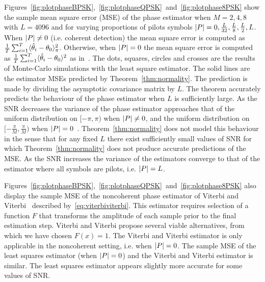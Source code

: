 \documentclass[journal]{IEEEtran}
\begin{document}
Figures~\ref{fig:plotphaseBPSK},~\ref{fig:plotphaseQPSK}~and~\ref{fig:plotphase8PSK} show the sample mean square error (MSE) of the phase estimator when $M=2,4,8$ with $L=4096$ and for varying proportions of pilots symbols ${\left\vert P \right\vert} = 0, \tfrac{L}{32}, \tfrac{L}{8}, \tfrac{L}{2}, L$.  When ${\left\vert P \right\vert} \neq 0$ (i.e. coherent detection) the mean square error is computed as $\tfrac{1}{T}\sum_{i=1}^T\langle \hat{\theta}_i - \theta_0 \rangle_\pi^2$.  Otherwise, when ${\left\vert P \right\vert}=0$ the mean square error is computed as $\tfrac{1}{T}\sum_{i=1}^T\langle \hat{\theta}_i - \theta_0 \rangle^2$ as in~\cite{McKilliam_leastsqPSKnoncoICASSP_2012}.  The dots, squares, circles and crosses are the results of Monte-Carlo simulations with the least square estimator.  The solid lines are the estimator MSEs predicted by Theorem~\ref{thm:normality}.   %
The prediction is made by dividing the asymptotic covariance matrix by $L$.  The theorem accurately predicts the behaviour of the phase estimator when $L$ is sufficiently large.  As the SNR decreases the variance of the phase estimator approaches that of the uniform distribution on $[-\pi, \pi)$ when ${\left\vert P \right\vert} \neq 0$, and the uniform distribution on $[-\tfrac{\pi}{M}, \tfrac{\pi}{M})$ when ${\left\vert P \right\vert}=0$~\cite{McKilliam_leastsqPSKnoncoICASSP_2012}.  Theorem~\ref{thm:normality} does not model this behaviour in the sense that for any fixed $L$ there exist sufficiently small values of SNR for which Theorem~\ref{thm:normality} does not produce accurate predictions of the MSE.  As the SNR increases the variance of the estimators converge to that of the estimator where all symbols are pilots, i.e. ${\left\vert P \right\vert} = L$.


Figures~\ref{fig:plotphaseBPSK},~\ref{fig:plotphaseQPSK}~and~\ref{fig:plotphase8PSK} also display the sample MSE of the noncoherent phase estimator of Viterbi and Viterbi~\cite{ViterbiViterbi_phase_est_1983} described by~\eqref{eq:viterbiviterbi}.  This estimator requires selection of a function $F$ that transforms the amplitude of each sample prior to the final estimation step.  %
Viterbi and Viterbi propose several viable alternatives, from which we have chosen $F(x) = 1$.  The Viterbi and Viterbi estimator is only applicable in the noncoherent setting, i.e. when ${\left\vert P \right\vert} = 0$.  The sample MSE of the least squares estimator (when ${\left\vert P \right\vert} = 0$) and the Viterbi and Viterbi estimator is similar.  The least squares estimator appears slightly more accurate for some values of SNR.
\end{document}
